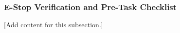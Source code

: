 
\subsubsection{E-Stop Verification and Pre-Task Checklist}
\label{subsubsec:design_2_8_5_estop_verification_pretask_checklist}

[Add content for this subsection.]
